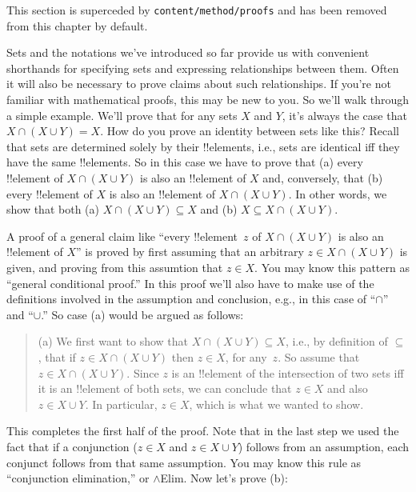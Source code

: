 \documentclass[../../../include/open-logic-section]{subfiles}
\begin{document}

\begin{editorial}
This section is superceded by \verb|content/method/proofs| and has
been removed from this chapter by default.
\end{editorial}

\begin{explain}
Sets and the notations we've introduced so far provide us with
convenient shorthands for specifying sets and expressing relationships
between them. Often it will also be necessary to prove claims about
such relationships. If you're not familiar with mathematical proofs,
this may be new to you. So we'll walk through a simple example. We'll
prove that for any sets $X$ and $Y$, it's always the case that $X \cap
(X \cup Y) = X$. How do you prove an identity between sets like this?
Recall that sets are determined solely by their !!{element}s, i.e.,
sets are identical iff they have the same !!{element}s. So in this
case we have to prove that (a) every !!{element} of $X \cap (X \cup
Y)$ is also an !!{element} of $X$ and, conversely, that (b) every
!!{element} of $X$ is also an !!{element} of $X \cap (X \cup Y)$. In
other words, we show that both (a) $X \cap (X \cup Y) \subseteq X$ and
(b) $X \subseteq X \cap (X \cup Y)$.

A proof of a general claim like ``every !!{element}~$z$ of $X \cap (X
\cup Y)$ is also an !!{element} of $X$'' is proved by first assuming
that an arbitrary $z \in X \cap (X \cup Y)$ is given, and proving from
this assumtion that $z \in X$. You may know this pattern as ``general
conditional proof.''  In this proof we'll also have to make use of the
definitions involved in the assumption and conclusion, e.g., in this
case of ``$\cap$'' and ``$\cup$.''  So case (a) would be argued as
follows:

\begin{quote}
(a) We first want to show that $X \cap (X \cup Y) \subseteq X$, i.e.,
by definition of $\subseteq$, that if $z \in X \cap (X \cup Y)$ then
$z \in X$, for any~$z$. So assume that $z \in X \cap (X \cup
Y)$. Since $z$ is an !!{element} of the intersection of two sets iff
it is an !!{element} of both sets, we can conclude that $z \in X$ and
also $z \in X \cup Y$. In particular, $z \in X$, which is what
we wanted to show.
\end{quote}

This completes the first half of the proof. Note that in the last
step we used the fact that if a conjunction ($z \in X$ and $z \in X
\cup Y$) follows from an assumption, each conjunct follows from that
same assumption. You may know this rule as ``conjunction
elimination,'' or $\land$Elim. Now let's prove (b):


\end{explain}
\end{document}
